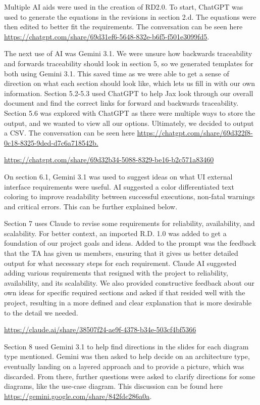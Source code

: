 Multiple AI aids were used in the creation of RD2.0. To start, ChatGPT
was used to generate the equations in the revisions in section 2.d. The
equations were then edited to better fit the requirements. The
conversation can be seen here
\url{https://chatgpt.com/share/69d31ef6-5648-832e-b6f5-f501e3099fd5}.

The next use of AI was Gemini 3.1. We were unsure how backwards
traceability and forwards traceability should look in section 5, so we
generated templates for both using Gemini 3.1. This saved time as we
were able to get a sense of direction on what each section should look
like, which lets us fill in with our own information. Section 5.2-5.3
used ChatGPT to help Jax look through our overall document and find the
correct links for forward and backwards traceability. Section 5.6 was
explored with ChatGPT as there were multiple ways to store the output,
and we wanted to view all our options. Ultimately, we decided to output
a CSV. The conversation can be seen here
\href{https://chatgpt.com/share/69d322f8-0c18-8325-9ded-d7c6a718542b}{https://chatgpt.com/share/69d322f8-0c18-8325-9ded-d7c6a718542b.}

\url{https://chatgpt.com/share/69d32b34-5088-8329-be16-b2c571a83460}

On section 6.1, Gemini 3.1 was used to suggest ideas on what UI external
interface requirements were useful. AI suggested a color differentiated
text coloring to improve readability between successful executions,
non-fatal warnings and critical errors. This can be further explained
below.

Section 7 uses Claude to revise some requirements for reliability,
availability, and scalability. For better context, an imported R.D. 1.0
was added to get a foundation of our project goals and ideas. Added to
the prompt was the feedback that the TA has given us members, ensuring
that it gives us better detailed output for what necessary steps for
each requirement. Claude AI suggested adding various requirements that
resigned with the project to reliability, availability, and its
scalability. We also provided constructive feedback about our own ideas
for specific required sections and asked if that resided well with the
project, resulting in a more defined and clear explanation that is more
desirable to the detail we needed.

\url{https://claude.ai/share/38507f24-ae9f-4378-b34e-503cf4bf5366}

Section 8 used Gemini 3.1 to help find directions in the slides for each
diagram type mentioned. Gemini was then asked to help decide on an
architecture type, eventually landing on a layered approach and to
provide a picture, which was discarded. From there, further questions
were asked to clarify directions for some diagrams, like the use-case
diagram. This discussion can be found here
\url{https://gemini.google.com/share/842fdc286a0a}.

